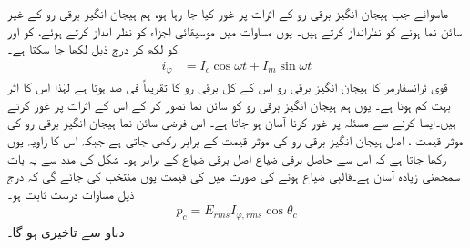 ماسوائے جب  ہیجان انگیز برقی رو کے اثرات پر غور کیا جا رہا ہو، ہم ہیجان انگیز برقی رو کے غیر سائن نما ہونے کو نظرانداز کرتے ہیں۔ یوں  مساوات  میں  موسیقائی اجزاء کو نظر انداز کرتے ہوئے،  کو  اور  کو  لکھ کر درج ذیل لکھا جا سکتا ہے۔
\begin{align*}
i_{\varphi}&=I_c\cos \omega t+I_m\sin \omega t
\end{align*}
 قوی ٹرانسفارمر کا  ہیجان انگیز برقی رو اس کے کل برقی رو کا تقریباً   فی صد  ہوتا ہے  لہٰذا  اس کا اثر بہت کم ہوتا ہے۔ یوں ہم  ہیجان انگیز برقی رو کو سائن نما تصور کر کے اس کے اثرات پر غور کرتے ہیں۔ایسا کرنے سے مسئلہ پر غور کرنا آسان ہو جاتا ہے۔ اس فرضی سائن نما  ہیجان انگیز برقی رو   کی موثر قیمت  ، اصل  ہیجان انگیز برقی رو کی موثر قیمت کے برابر رکھی جاتی ہے جبکہ اس کا زاویہ  یوں رکھا جاتا ہے کہ اس سے حاصل برقی ضیاع اصل برقی ضیاع کے برابر ہو۔ شکل   کی مدد سے یہ بات سمجھنی زیادہ آسان ہے۔قالبی ضیاع  ہونے کی صورت میں  کی قیمت یوں منتخب کی جائے گی کہ درج ذیل مساوات درست ثابت ہو۔
\begin{align}
p_c=E_{rms} I_{\varphi,rms} \cos \theta_c
\end{align}
 دباو   سے   تاخیری ہو گا۔

